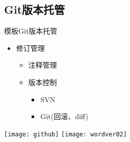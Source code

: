 \documentclass[fontset = none, xcolor=svgnames, t, aspectratio=169]{ctexbeamer}
\begin{document}
\subsection[Git托管]{Git版本托管}
\begin{frame}{\nwafuthesis 模板}{Git版本托管}
  \begin{itemize}
  \item 修订管理
    \begin{itemize}
    \item 注释管理
    \item 版本控制
      \begin{itemize}
      \item SVN
      \item Git(回滚、diff)
      \end{itemize}
    \end{itemize}
  \end{itemize}
  \begin{center}
    \texttt{[image: github]}\quad
    \texttt{[image: wordver02]}\quad
  \end{center}
\end{frame}
\end{document}
